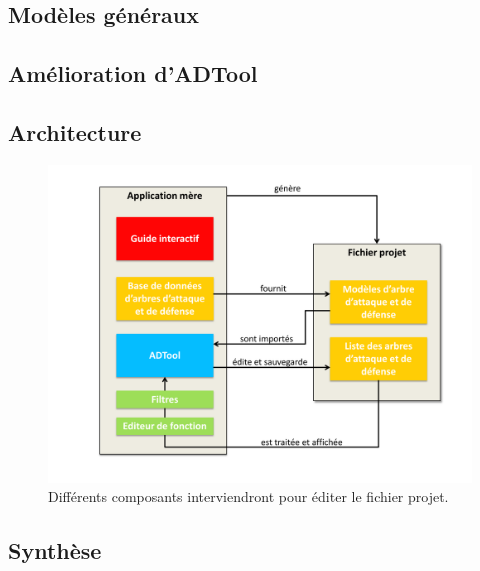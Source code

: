    \subsection{Modèles généraux}
        \label{sec:modele}


    \subsection{Amélioration d'ADTool}
        \label{sec:adtoolpp}
    

    \subsection{Architecture}
        \label{sec:archi}

        \begin{figure}
            \begin{center}
                \includegraphics[width=1\textwidth]{figure/archi.pdf}
            \end{center}
            \caption{Différents composants interviendront pour éditer le fichier projet.}
            \label{fig:archi}
        \end{figure}


    \subsection{Synthèse}
        \label{sec:cahier_synthese}